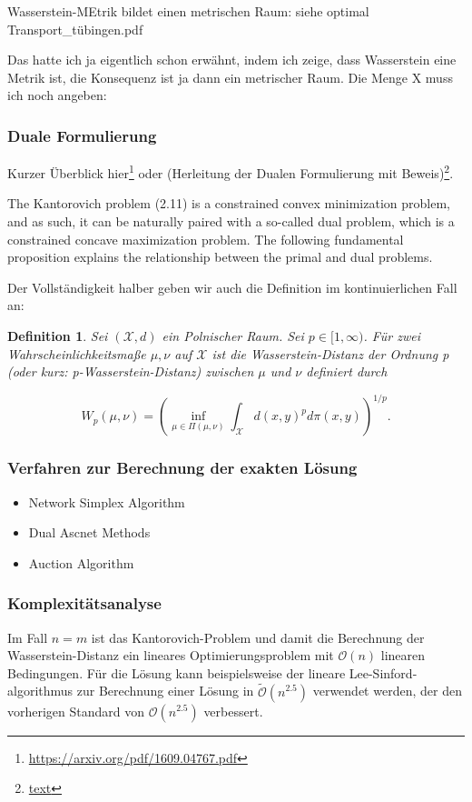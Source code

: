 \documentclass[11pt,a4paper]{article}
\def\emph#1{\textit{#1}}
\newtheorem{definition}[theorem]{Definition}
\numberwithin{equation}{section}
\begin{document}
	Wasserstein-MEtrik bildet einen metrischen Raum: siehe optimal Transport\_tübingen.pdf
	
	Das hatte ich ja eigentlich schon erwähnt, indem ich zeige, dass Wasserstein eine Metrik ist, die Konsequenz ist ja dann ein metrischer Raum. Die  Menge X muss ich noch angeben:
	\subsubsection{Duale Formulierung}
	Kurzer Überblick hier\footnote{\url{https://arxiv.org/pdf/1609.04767.pdf}}
	oder (Herleitung der Dualen Formulierung mit Beweis)\footnote{\url{text}}.
	
	The Kantorovich problem (2.11) is a constrained convex minimization problem, and as
	such, it can be naturally paired with a so-called dual problem, which is a constrained
	concave maximization problem. The following fundamental proposition explains the
	relationship between the primal and dual problems.
	
	Der Vollständigkeit halber geben wir auch die Definition im kontinuierlichen Fall an:
	
	\begin{definition}\cite{villani2009optimal}
	Sei $(\mathcal{X},d)$ ein Polnischer Raum. Sei $p\in [1, \infty)$. Für zwei Wahrscheinlichkeitsmaße $\mu, \nu$ auf $\mathcal{X}$ ist die \emph{Wasserstein-Distanz der Ordnung p} (oder kurz: p-Wasserstein-Distanz) zwischen $\mu$ und $\nu$ definiert durch
	
	\begin{equation}
		W_p(\mu, \nu) = \left( \inf_{\mu \in \Pi(\mu, \nu)}\int_{\mathcal{X}}{d(x,y)^pd\pi(x,y)}\right) ^{1/p}.
	\end{equation}	
	\end{definition}
	\subsubsection{Verfahren zur Berechnung der exakten Lösung}
	\begin{itemize}
		\item Network Simplex Algorithm
		\item Dual Ascnet Methods
		\item Auction Algorithm
	\end{itemize}
	
	\subsubsection{Komplexitätsanalyse}
	Im Fall $n=m$ ist das Kantorovich-Problem und damit die Berechnung der Wasserstein-Distanz ein lineares Optimierungsproblem mit $\mathcal{O}(n)$ linearen Bedingungen. Für die Lösung kann beispielsweise der lineare Lee-Sinford-algorithmus zur Berechnung einer Lösung in $\tilde{\mathcal{O}}(n^{2.5})$ \cite{lee2014path} verwendet werden, der den vorherigen Standard von $\mathcal{O}(n^{2.5})$ \cite{renegar1988polynomial} verbessert.
\end{document}
